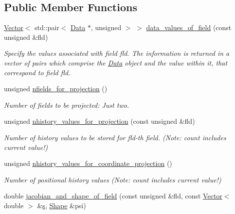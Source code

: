 \subsection*{Public Member Functions}
\begin{DoxyCompactItemize}
\item 
\hyperlink{classoomph_1_1Vector}{Vector}$<$ std\+::pair$<$ \hyperlink{classoomph_1_1Data}{Data} $\ast$, unsigned $>$ $>$ \hyperlink{classoomph_1_1ProjectableDisplacementBasedFoepplvonKarmanElement_a18725fa9db7ade75bc789396bb91a04a}{data\+\_\+values\+\_\+of\+\_\+field} (const unsigned \&fld)
\begin{DoxyCompactList}\small\item\em Specify the values associated with field fld. The information is returned in a vector of pairs which comprise the \hyperlink{classoomph_1_1Data}{Data} object and the value within it, that correspond to field fld. \end{DoxyCompactList}\item 
unsigned \hyperlink{classoomph_1_1ProjectableDisplacementBasedFoepplvonKarmanElement_a4146ddb00d3145268ccffc6a9742e1a5}{nfields\+\_\+for\+\_\+projection} ()
\begin{DoxyCompactList}\small\item\em Number of fields to be projected\+: Just two. \end{DoxyCompactList}\item 
unsigned \hyperlink{classoomph_1_1ProjectableDisplacementBasedFoepplvonKarmanElement_a860e5d23c30436549175b36b508e62a0}{nhistory\+\_\+values\+\_\+for\+\_\+projection} (const unsigned \&fld)
\begin{DoxyCompactList}\small\item\em Number of history values to be stored for fld-\/th field. (Note\+: count includes current value!) \end{DoxyCompactList}\item 
unsigned \hyperlink{classoomph_1_1ProjectableDisplacementBasedFoepplvonKarmanElement_a7366549f01d46f1830bade297af61bdb}{nhistory\+\_\+values\+\_\+for\+\_\+coordinate\+\_\+projection} ()
\begin{DoxyCompactList}\small\item\em Number of positional history values (Note\+: count includes current value!) \end{DoxyCompactList}\item 
double \hyperlink{classoomph_1_1ProjectableDisplacementBasedFoepplvonKarmanElement_a03270161594fb96325530ba9d1b6d291}{jacobian\+\_\+and\+\_\+shape\+\_\+of\+\_\+field} (const unsigned \&fld, const \hyperlink{classoomph_1_1Vector}{Vector}$<$ double $>$ \&\hyperlink{cfortran_8h_ab7123126e4885ef647dd9c6e3807a21c}{s}, \hyperlink{classoomph_1_1Shape}{Shape} \&psi)

\end{DoxyCompactItemize}
